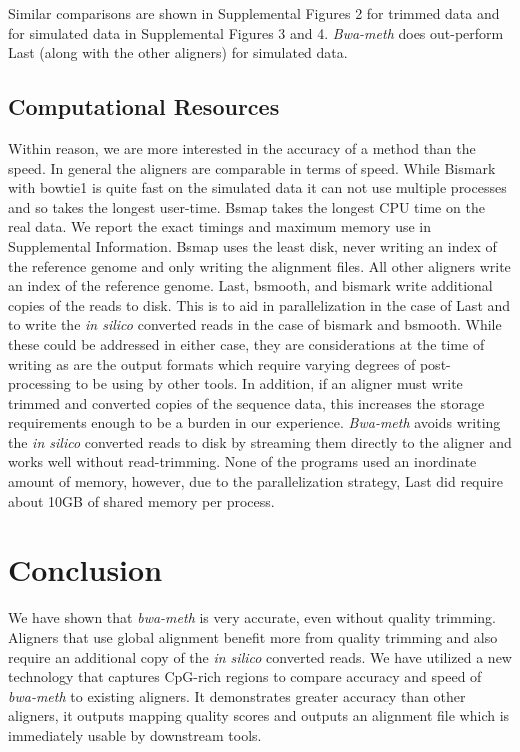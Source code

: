 \documentclass{bioinfo}
\begin{document}
Similar comparisons are shown in Supplemental Figures 2
for trimmed data and for simulated data in Supplemental Figures 3 and 4.
\textit{Bwa-meth} does out-perform Last (along with the other aligners)
for simulated data.

\subsection{Computational Resources}
Within reason, we are more interested in the accuracy of a
method than the speed. In general the aligners are comparable in terms of
speed. While Bismark with bowtie1 is quite fast on the simulated data it
can not use multiple processes and so takes the longest user-time. Bsmap
takes the longest CPU time on the real data. We report the exact 
timings and maximum memory use in Supplemental Information.
Bsmap uses the least disk, never writing an index of the reference genome
and only writing the alignment files. All other aligners write an index of
the reference genome. Last, bsmooth, and bismark write additional copies of the
reads to disk. This is to aid in parallelization in the case of Last and to
write the \emph{in silico} converted reads in the case of bismark and bsmooth.
While these could be addressed in either case, they are considerations
at the time of writing as are the output formats which require varying degrees
of post-processing to be using by other tools.
In addition, if an aligner must write trimmed and converted copies of the
sequence data, this increases the storage requirements enough to be a
burden in our experience. \textit{Bwa-meth} avoids writing the \emph{in silico}
converted reads to disk by streaming them directly to the aligner and works
well without read-trimming.
None of the programs used an inordinate amount of memory, however, due to
the parallelization strategy, Last did require about 10GB of shared memory
per process.

%
%

\section{Conclusion}
We have shown that \textit{bwa-meth} is very accurate, even without quality
trimming. Aligners that use global alignment benefit more from quality trimming
and also require an additional copy of the \emph{in silico} converted reads.
We have utilized a new technology that captures CpG-rich regions to compare
accuracy and speed of \textit{bwa-meth} to existing aligners.
It demonstrates greater accuracy than other aligners, it outputs mapping quality
scores and outputs an alignment file which is immediately usable by downstream
tools.
\end{document}
